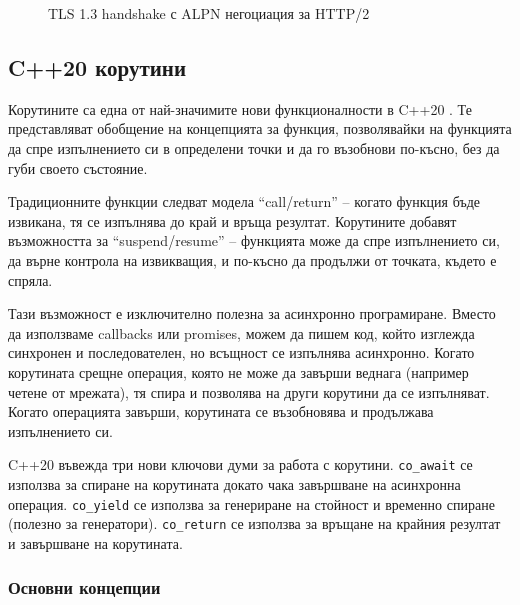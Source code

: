 \begin{figure}[H]
\caption{TLS 1.3 handshake с ALPN негоциация за HTTP/2}
\label{fig:tls-handshake}
\end{figure}

\subsection{C++20 корутини}

Корутините са една от най-значимите нови функционалности в C++20 \cite{cpp20standard}. Те представляват обобщение на концепцията за функция, позволявайки на функцията да спре изпълнението си в определени точки и да го възобнови по-късно, без да губи своето състояние.

Традиционните функции следват модела ``call/return'' -- когато функция бъде извикана, тя се изпълнява до край и връща резултат. Корутините добавят възможността за ``suspend/resume'' -- функцията може да спре изпълнението си, да върне контрола на извикващия, и по-късно да продължи от точката, където е спряла.

Тази възможност е изключително полезна за асинхронно програмиране. Вместо да използваме callbacks или promises, можем да пишем код, който изглежда синхронен и последователен, но всъщност се изпълнява асинхронно. Когато корутината срещне операция, която не може да завърши веднага (например четене от мрежата), тя спира и позволява на други корутини да се изпълняват. Когато операцията завърши, корутината се възобновява и продължава изпълнението си.

C++20 въвежда три нови ключови думи за работа с корутини. \texttt{co\_await} се използва за спиране на корутината докато чака завършване на асинхронна операция. \texttt{co\_yield} се използва за генериране на стойност и временно спиране (полезно за генератори). \texttt{co\_return} се използва за връщане на крайния резултат и завършване на корутината.

\subsubsection{Основни концепции}

